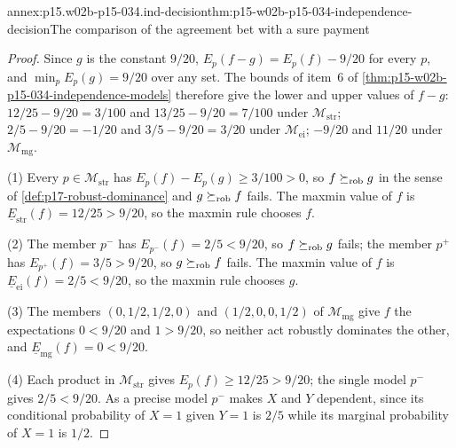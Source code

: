 \begin{annexitem}{annex:p15.w02b-p15-034.ind-decision}{thm:p15-w02b-p15-034-independence-decision}{The comparison of the agreement bet with a sure payment}
\begin{proof}
Since \(g\) is the constant \(9/20\), \(E_p(f-g)=E_p(f)-9/20\) for every
\(p\), and \(\min_{p}E_p(g)=9/20\) over any set. The bounds of item~6 of
\cref{thm:p15-w02b-p15-034-independence-models} therefore give the lower
and upper values of \(f-g\): \(12/25-9/20=3/100\) and \(13/25-9/20=7/100\)
under \(\mathcal M_{\mathrm{str}}\); \(2/5-9/20=-1/20\) and
\(3/5-9/20=3/20\) under \(\mathcal M_{\mathrm{ei}}\); \(-9/20\) and
\(11/20\) under \(\mathcal M_{\mathrm{mg}}\).

(1) Every \(p\in\mathcal M_{\mathrm{str}}\) has
\(E_p(f)-E_p(g)\geq3/100>0\), so \(f\succeq_{\rm rob}g\) in the sense of
\cref{def:p17-robust-dominance} and \(g\succeq_{\rm rob}f\) fails. The
maxmin value of \(f\) is \(\underline E_{\mathrm{str}}(f)=12/25>9/20\), so
the maxmin rule chooses \(f\).

(2) The member \(p^-\) has \(E_{p^-}(f)=2/5<9/20\), so
\(f\succeq_{\rm rob}g\) fails; the member \(p^+\) has
\(E_{p^+}(f)=3/5>9/20\), so \(g\succeq_{\rm rob}f\) fails. The maxmin value
of \(f\) is \(\underline E_{\mathrm{ei}}(f)=2/5<9/20\), so the maxmin rule chooses
\(g\).

(3) The members \((0,1/2,1/2,0)\) and \((1/2,0,0,1/2)\) of
\(\mathcal M_{\mathrm{mg}}\) give \(f\) the expectations \(0<9/20\) and
\(1>9/20\), so neither act robustly dominates the other, and
\(\underline E_{\mathrm{mg}}(f)=0<9/20\).

(4) Each product in \(\mathcal M_{\mathrm{str}}\) gives
\(E_p(f)\geq12/25>9/20\); the single model \(p^-\) gives \(2/5<9/20\). As a
precise model \(p^-\) makes \(X\) and \(Y\) dependent, since its
conditional probability of \(X=1\) given \(Y=1\) is \(2/5\) while its
marginal probability of \(X=1\) is \(1/2\).
\end{proof}
\end{annexitem}
